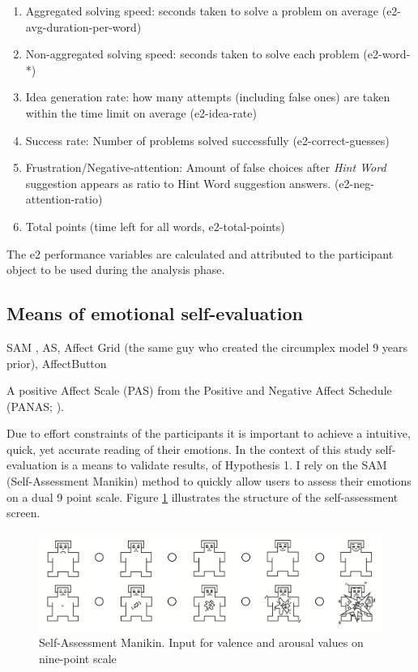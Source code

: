 		\begin{enumerate}
			\item Aggregated solving speed: seconds taken to solve a problem on average (e2-avg-duration-per-word)
			\item Non-aggregated solving speed: seconds taken to solve each problem (e2-word-*)
			\item Idea generation rate: how many attempts (including false ones) are taken within the time limit on average (e2-idea-rate)
			\item Success rate: Number of problems solved successfully (e2-correct-guesses)
			\item Frustration/Negative-attention: Amount of false choices after \textit{Hint Word} suggestion appears as ratio to Hint Word suggestion answers. (e2-neg-attention-ratio)
			\item Total points (time left for all words, e2-total-points)
		\end{enumerate}
	
		The e2 performance variables are calculated and attributed to the participant object to be used during the analysis phase.
		

	\subsection{Means of emotional self-evaluation} \label{sec:selfeval}
%	
	  \cite{Harley2016}
	
	SAM , AS, Affect Grid \cite{Russell1989} (the same guy who created the circumplex model 9 years prior), 
	AffectButton \cite{Broekens}
	
	A positive Affect Scale (PAS) from the Positive and Negative Affect Schedule (PANAS; \cite{Watson1988}).
	
	Due to effort constraints of the participants it is important to achieve a intuitive, quick, yet accurate reading of their emotions. In the context of this study self-evaluation is a means to validate results, of Hypothesis 1. I rely on the SAM (Self-Assessment Manikin) method \cite{Bradley1994} to quickly allow users to assess their emotions on a dual 9 point scale. Figure \ref{fig:sam} illustrates the structure of the self-assessment screen.
	
\begin{figure}[h]
	\centering
	\includegraphics[width=0.9\linewidth]{graphics/SAM}
	\caption{Self-Assessment Manikin. Input for valence and arousal values on nine-point scale}
	\label{fig:sam}
\end{figure}
	
